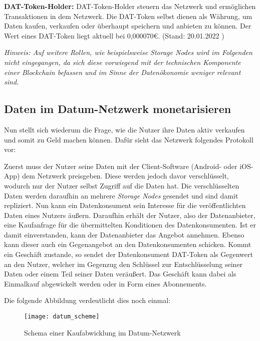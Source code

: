 \noindent \textbf{DAT-Token-Holder:} DAT-Token-Holder steuern das Netzwerk und ermöglichen Transaktionen in dem Netzwerk. Die DAT-Token selbst dienen als Währung, um Daten kaufen, verkaufen oder überhaupt speichern und anbieten zu können. Der Wert eines DAT-Token liegt aktuell bei 0,000070€. (Stand: 20.01.2022 \cite{DAT_Token_price}) \newline

\noindent \textit{Hinweis: Auf weitere Rollen, wie beispielsweise Storage Nodes wird im Folgenden nicht eingegangen, da sich diese vorwiegend mit der technischen Komponente einer Blockchain befassen und im Sinne der Datenökonomie weniger relevant sind.}

\subsection{Daten im Datum-Netzwerk monetarisieren}
Nun stellt sich wiederum die Frage, wie die Nutzer ihre Daten aktiv verkaufen und somit zu Geld machen können. Dafür sieht das Netzwerk folgendes Protokoll vor:\newline

\noindent Zuerst muss der Nutzer seine Daten mit der Client-Software (Android- oder iOS-App) dem Netzwerk preisgeben. Diese werden jedoch davor verschlüsselt, wodurch nur der Nutzer selbst Zugriff auf die Daten hat. Die verschlüsselten Daten werden daraufhin an mehrere \textit{Storage Nodes} gesendet und sind damit repliziert. Nun kann ein Datenkonsument sein Interesse für die veröffentlichten Daten eines Nutzers äußern. Daraufhin erhält der Nutzer, also der Datenanbieter, eine Kaufanfrage für die übermittelten Konditionen des Datenkonsumenten. Ist er damit einverstanden, kann der Datenanbieter das Angebot annehmen. Ebenso kann dieser auch ein Gegenangebot an den Datenkonsumenten schicken. Kommt ein Geschäft zustande, so sendet der Datenkonsument DAT-Token als Gegenwert an den Nutzer, welcher im Gegenzug den Schlüssel zur Entschlüsselung seiner Daten oder einem Teil seiner Daten veräußert.
Das Geschäft kann dabei als Einmalkauf abgewickelt werden oder in Form eines Abonnements. \cite{datum_2017} \newline

\noindent Die folgende Abbildung verdeutlicht dies noch einmal:

\begin{figure}[!ht]
	\centering
	\texttt{[image: datum\_scheme]}
	\caption{Schema einer Kaufabwicklung im Datum-Netzwerk \cite{datum_2017}}
	\label{fig:datumScheme}
\end{figure}
\FloatBarrier